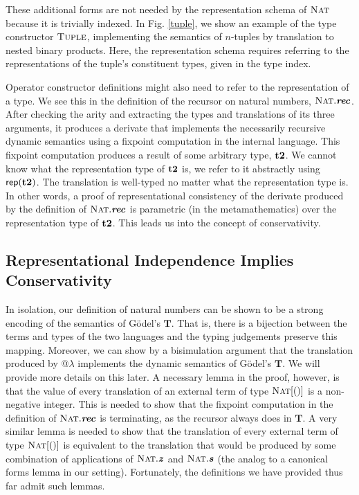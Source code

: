\documentclass[9pt,preprint]{sigplanconf}
\begin{document}
These additional forms are not needed by the representation schema of $\textsc{Nat}$  because it is trivially indexed. In Fig. \ref{tuple}, we show an example of the type constructor $\textsc{Tuple}$, implementing the semantics of $n$-tuples by translation to nested binary products. Here, the representation schema requires referring to the representations of the tuple's constituent types, given in the type index.

Operator constructor definitions might also need to refer to the representation of a type. We see this in the definition of the recursor on natural numbers, $\textsc{Nat}.\textbf{\textit{rec}}$. After checking the arity and extracting the types and translations of its three arguments, it produces a derivate that implements the necessarily recursive dynamic semantics using a fixpoint computation in the internal language. This fixpoint computation produces a result of some arbitrary type, ${\textbf{t2}}$. We cannot know what the representation type of ${\textbf{t2}}$ is, we refer to it abstractly using ${\sf rep}({\textbf{t2}})$. The translation is well-typed no matter what the representation type is. In other words, a proof of representational consistency of the derivate produced by the definition of $\textsc{Nat}.\textbf{\textit{rec}}$ is parametric (in the metamathematics) over the representation type of ${\textbf{t2}}$. This leads us into the concept of conservativity.

\subsection{Representational Independence Implies Conservativity}
In isolation, our definition of natural numbers can be shown to be a strong encoding of the semantics of G\"odel's $\mathbf{T}$. That is, there is a bijection between the terms and types of the two languages and the typing judgements preserve this mapping. Moreover, we can show by a bisimulation argument that the translation produced by @$\lambda$ implements the dynamic semantics of G\"odel's $\mathbf{T}$. We will provide more details on this later. A necessary lemma in the proof, however, is that the value of every translation of an external term of type $\textsc{Nat}[()]$ is a non-negative integer. This is needed to show that the fixpoint computation in the definition of $\textsc{Nat}.\textbf{\textit{rec}}$ is terminating, as the recursor always does in $\mathbf{T}$. A very similar lemma is needed to show that the translation of every external term of type $\textsc{Nat}[()]$ is equivalent to the translation that would be produced by some combination of applications of $\textsc{Nat}.\textbf{\textit{z}}$ and $\textsc{Nat}.\textbf{\textit{s}}$ (the analog to a canonical forms lemma in our setting). Fortunately, the definitions we have provided thus far admit such lemmas.
\end{document}
